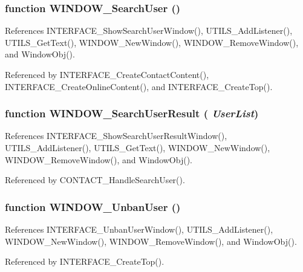 \subsubsection{\setlength{\rightskip}{0pt plus 5cm}function WINDOW\_\-SearchUser ()}\label{window_2window_8js_c12a5400ad4c700cfc149d03ae412c47}




References INTERFACE\_\-ShowSearchUserWindow(), UTILS\_\-AddListener(), UTILS\_\-GetText(), WINDOW\_\-NewWindow(), WINDOW\_\-RemoveWindow(), and WindowObj().

Referenced by INTERFACE\_\-CreateContactContent(), INTERFACE\_\-CreateOnlineContent(), and INTERFACE\_\-CreateTop().
\subsubsection{\setlength{\rightskip}{0pt plus 5cm}function WINDOW\_\-SearchUserResult ( {\em UserList})}\label{window_2window_8js_6d03922beae5db1603fa1f2d195e4610}




References INTERFACE\_\-ShowSearchUserResultWindow(), UTILS\_\-AddListener(), UTILS\_\-GetText(), WINDOW\_\-NewWindow(), WINDOW\_\-RemoveWindow(), and WindowObj().

Referenced by CONTACT\_\-HandleSearchUser().
\subsubsection{\setlength{\rightskip}{0pt plus 5cm}function WINDOW\_\-UnbanUser ()}\label{window_2window_8js_a6de30616a652bce072098f4e3ff5ca7}




References INTERFACE\_\-UnbanUserWindow(), UTILS\_\-AddListener(), WINDOW\_\-NewWindow(), WINDOW\_\-RemoveWindow(), and WindowObj().

Referenced by INTERFACE\_\-CreateTop().